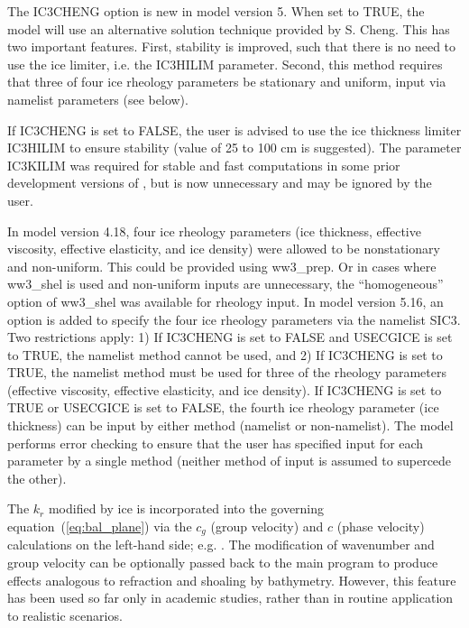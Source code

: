 The {\code IC3CHENG} option is new in model version 5. When set to {\code TRUE}, the model will use an alternative solution technique provided by S. Cheng. This has two important features. First, stability is improved, such that there is no need to use the ice limiter, i.e. the {\code IC3HILIM} parameter. Second, this method requires that three of four ice rheology parameters be stationary and uniform, input via namelist parameters (see below).

If {\code IC3CHENG} is set to {\code FALSE}, the user is advised to use the ice thickness limiter {\code IC3HILIM} to ensure stability (value of 25 to 100 cm is suggested). The parameter {\code IC3KILIM} was required for stable and fast computations in some prior development versions of \ws, but is now unnecessary and may be ignored by the user.

In model version 4.18, four ice rheology parameters (ice thickness, effective viscosity, effective elasticity, and ice density) were allowed to be nonstationary and non-uniform. This could be provided using {\file ww3\_prep}. Or in cases where {\file ww3\_shel} is used and non-uniform inputs are unnecessary, the ``homogeneous'' option of {\file ww3\_shel} was available for rheology input. In model version 5.16, an option is added to specify the four ice rheology parameters via the namelist {\F SIC3}. Two restrictions apply: 1) If {\code IC3CHENG} is set to {\code FALSE} and  {\code USECGICE} is set to {\code TRUE}, the namelist method cannot be used, and 2) If {\code IC3CHENG} is set to {\code TRUE}, the namelist method must be used for three of the rheology parameters (effective viscosity, effective elasticity, and ice density). If {\code IC3CHENG} is set to {\code TRUE} or {\code USECGICE} is set to {\code FALSE}, the fourth ice rheology parameter (ice thickness) can be input by either method (namelist or non-namelist). The model performs error checking to ensure that the user has specified input for each parameter by a single method (neither method of input is assumed to supercede the other).

The ${k_r}$ modified by ice is incorporated into the governing
equation~(\ref{eq:bal_plane}) via the $c_g$ (group velocity) and $c$ (phase velocity) calculations on the
left-hand side; e.g. \citet[][and subsequent unpublished work]{art:RH09}. 
The modification of wavenumber and group velocity can be optionally passed back to the main program to produce effects analogous to refraction and shoaling by bathymetry. However, this feature has been used so far only in academic studies, rather than in routine application to realistic scenarios.\\


